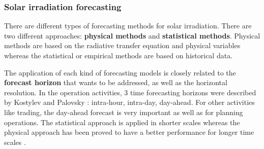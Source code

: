 
 
  



\subsubsection{Solar irradiation forecasting}

There are different types of forecasting methods for solar irradiation. There are two different approaches: \textbf{physical methods} and \textbf{statistical methods}. Physical methods are based on the radiative transfer equation and physical variables whereas the statistical or empirical methods are based on historical data.

The application of each kind of forecasting models is closely related to the \textbf{forecast horizon} that wants to be addressed, as well as the horizontal resolution. In the operation activities, 3 time forecasting horizons were described by Kostylev and Palovsky \cite*{kostylev2011solar}: intra-hour, intra-day, day-ahead. For other activities like trading, the day-ahead forecast is very important as well as for planning operations. The statistical approach is applied in shorter scales whereas the physical approach has been proved to have a better performance for longer time scales \cite*{Perez2010, Diagne2013, Widen2015}.%

